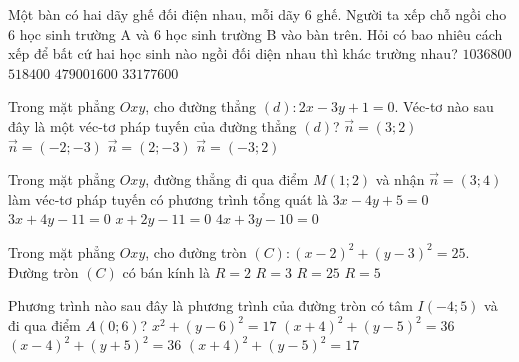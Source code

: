 \begin{ex}%
	Một bàn có hai dãy ghế đối điện nhau, mỗi dãy $6$ ghế. Người ta xếp chỗ ngồi cho $6$ học sinh trường A và $6$ học sinh trường B vào bàn trên. Hỏi có bao nhiêu cách xếp để bất cứ hai học sinh nào ngồi đối diện nhau thì khác trường nhau?
	\choice
	{\True $1036800$}
	{$518400$}
	{$479001600$}
	{$33177600$}
\end{ex}
\begin{ex}%
	Trong mặt phẳng $Oxy$, cho đường thẳng $(d)\colon 2x-3y+1=0$. Véc-tơ nào sau đây là một véc-tơ pháp tuyến của đường thẳng $(d)$?
	\choice
	{$\vec{n}=(3;2)$}
	{$\vec{n}=(-2;-3)$}
	{\True $\vec{n}=(2;-3)$}
	{$\vec{n}=(-3;2)$}
\end{ex}
\begin{ex}%
	Trong mặt phẳng $Oxy$, đường thẳng đi qua điểm $M(1;2)$ và nhận $\vec{n}=(3;4)$ làm véc-tơ pháp tuyến có phương trình tổng quát là
	\choice
	{$3x-4y+5=0$}
	{\True $3x+4y-11=0$}
	{$x+2y-11=0$}
	{$4x+3y-10=0$}
\end{ex}
\begin{ex}%
	Trong mặt phẳng $Oxy$, cho đường tròn $(C)\colon (x-2)^2+(y-3)^2=25$. Đường tròn $(C)$ có bán kính là
	\choice
	{$R=2$}
	{$R=3$}
	{$R=25$}
	{\True $R=5$}
\end{ex}
\begin{ex}%
	Phương trình nào sau đây là phương trình của đường tròn có tâm $I(-4;5)$ và đi qua điểm $A(0;6)$?
	\choice
	{$x^2+(y-6)^2=17$}
	{$(x+4)^2+(y-5)^2=36$}
	{$(x-4)^2+(y+5)^2=36$}
	{\True $(x+4)^2+(y-5)^2=17$}
\end{ex}
